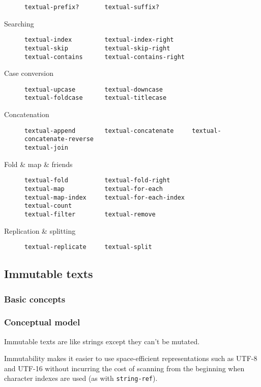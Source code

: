 \begin{description}
\begin{verbatim}
textual-prefix?       textual-suffix?    
\end{verbatim}
\item[Searching]
\begin{verbatim}
textual-index         textual-index-right
textual-skip          textual-skip-right
textual-contains      textual-contains-right
\end{verbatim}
\item[ Case conversion]
\begin{verbatim}
textual-upcase        textual-downcase
textual-foldcase      textual-titlecase
\end{verbatim}
\item[ Concatenation]
\begin{verbatim}
textual-append        textual-concatenate     textual-concatenate-reverse
textual-join
\end{verbatim}
\item[Fold \& map \& friends]
\begin{verbatim}
textual-fold          textual-fold-right
textual-map           textual-for-each
textual-map-index     textual-for-each-index
textual-count
textual-filter        textual-remove
\end{verbatim}
\item[Replication \& splitting]
\begin{verbatim}
textual-replicate     textual-split
\end{verbatim}
\end{description}

\subsection{Immutable texts}

\subsubsection{Basic concepts}\label{basic-concepts}


\subsubsection{{Conceptual model}}\label{conceptual-model}

Immutable texts are like strings except they can't be mutated.

Immutability makes it easier to use space-efficient representations such
as UTF-8 and UTF-16 without incurring the cost of scanning from the
beginning when character indexes are used (as with \texttt{string-ref}).

